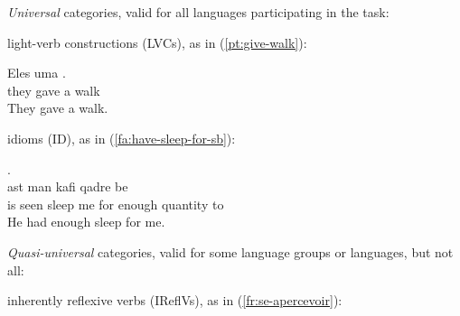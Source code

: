 \documentclass[output=paper,
modfonts,
]{langscibook}
\begin{document}
\begin{senum}
\item \textit{Universal} categories, valid for all languages participating in the task:
\begin{senum}
\item light-verb constructions (LVCs), as in (\ref{pt:give-walk}):

\ea \label{pt:give-walk}
\settowidth {} 
\gll Eles  uma .\\
they gave a walk \\ 
\glt They gave a walk. 
\z

\item idioms (ID), as in (\ref{fa:have-sleep-for-sb}):

\ea \label{fa:have-sleep-for-sb}
\settowidth {} 
\glll .       \\
ast   man  kafi qadre be  \\
is seen sleep me for enough quantity to\\ 
\glt He had enough sleep for me. 
\z

\end{senum}
\item \textit{Quasi-universal} categories, valid for some language groups or languages, but not all:
\begin{senum}
\item inherently reflexive verbs (IReflVs), as in (\ref{fr:se-apercevoir}):


\end{senum}
\end{senum}
\end{document}
